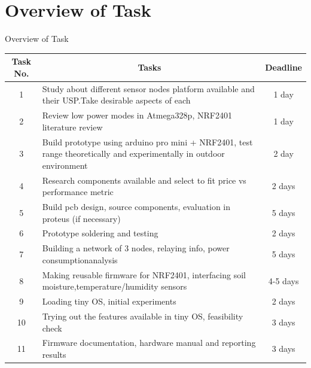 \documentclass[10pt, a4paper]{beamer}
\begin{document}
\section{Overview of Task}
\begin{frame}{Overview of Task}

\begin{table}[htbp]
 \tiny
  \centering
  
    \begin{tabular}{|c|l|c|}
    \hline
    \textbf{Task No.} & \multicolumn{1}{|c|}{\textbf{Tasks}} & \textbf{Deadline} \\\hline
    1     & \multicolumn{1}{|p{23.5em}|}{Study about different sensor nodes platform available and their USP.\newline{}Take desirable aspects of each} & 1 day \\\hline
    2     & Review low power modes in Atmega328p, NRF2401 literature review & 1 day \\\hline
    3     & \multicolumn{1}{|p{23.5em}|}{Build prototype using arduino pro mini + NRF2401, test range theoretically and experimentally in outdoor \newline environment} & 2 day \\\hline
    4     & \multicolumn{1}{|p{23.5em}|}{Research components available and select to fit price vs performance  metric} & 2 days \\\hline
    5     & \multicolumn{1}{|p{23.5em}|}{Build pcb design, source components, evaluation \newline in proteus  (if  necessary)} & 5 days \\\hline
    6     & \multicolumn{1}{|p{23.5em}|}{Prototype soldering and testing} & 2 days \\\hline
    7     & \multicolumn{1}{|p{23.5em}|}{Building a network of 3 nodes, relaying info, power consumption\newline{}analysis} & 5 days \\\hline
    8     & \multicolumn{1}{|p{23.5em}|}{Making reusable firmware for NRF2401, interfacing soil moisture,\newline{}temperature/humidity sensors} & 4-5 days \\\hline
    9     & \multicolumn{1}{|p{23.5em}|}{Loading tiny OS, initial experiments} & 2 days \\\hline
    10    & \multicolumn{1}{|p{23.5em}|}{Trying out the features available in tiny OS, feasibility check} & 3 days \\\hline
    11    & Firmware documentation, hardware manual and reporting results & 3 days \\\hline
    \end{tabular}%
  \label{tab:addlabel}%
\end{table}%

	


\end{frame}
\end{document}
